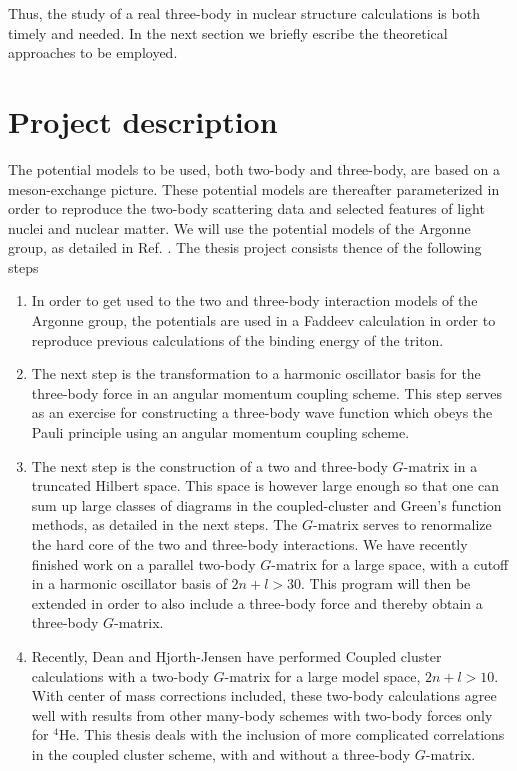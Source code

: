 \documentclass{article}
\begin{document}
Thus, the study of a real three-body in nuclear structure calculations
is both timely and needed. 
In the next section we briefly escribe the theoretical approaches to be employed.
\section{Project description}
The potential models to be used, both two-body and three-body, are based
on a meson-exchange picture. These potential models are thereafter 
parameterized
in order to reproduce the two-body scattering data and selected features
of light nuclei and nuclear matter.
We will use the potential models of the Argonne group, as detailed in 
Ref. \cite{threeb}.
The thesis project consists thence of the following steps
\begin{enumerate}
\item In order to get used to the two and three-body interaction models of
the Argonne group, the potentials are used in a Faddeev calculation in order
to reproduce previous calculations of the binding energy of the triton.
\item The next step is 
the transformation to a  
harmonic oscillator basis for the three-body force in an angular momentum
coupling scheme.
This step serves as an exercise
for constructing  a three-body wave function which obeys the Pauli principle
using an angular momentum coupling scheme.
\item The next step is the construction of a two and three-body $G$-matrix
in a truncated Hilbert space. This space is however large enough so that one
can sum up large classes of diagrams in the coupled-cluster 
and Green's function methods, as detailed in the next  steps.
The $G$-matrix serves to renormalize the hard core of the two and three-body
interactions.
We have recently \cite{khj2002} finished work on a parallel two-body
$G$-matrix for a large space, with a cutoff in a harmonic oscillator basis
of $2n+l > 30$. This program will then be extended in order to also
include a three-body force and thereby obtain a three-body $G$-matrix.

\item Recently, Dean and Hjorth-Jensen \cite{dhj2002} have performed 
Coupled cluster calculations with a two-body $G$-matrix for a large 
model space, $2n+l > 10$. With center of mass corrections included,
these two-body calculations agree well with results from other many-body
schemes with two-body forces only for $^4$He.
This thesis deals with the inclusion of more complicated 
correlations in the coupled
cluster scheme, with and without a three-body $G$-matrix.


\end{enumerate}
\end{document}
